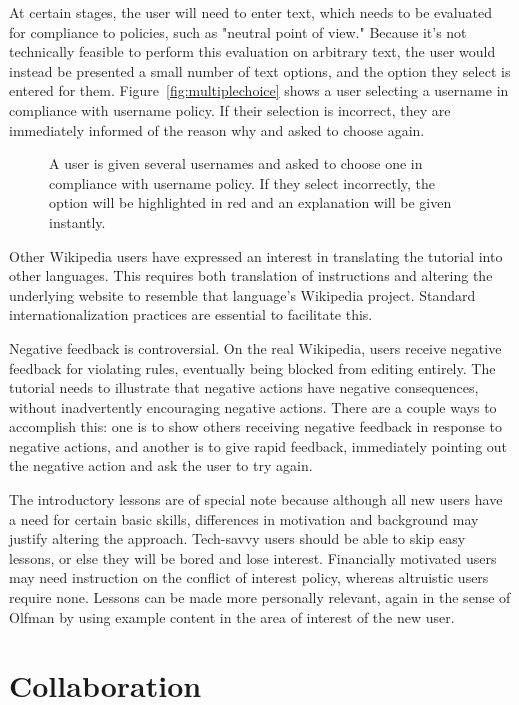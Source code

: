 \documentclass{acm_proc_article-sp}
\begin{document}
At certain stages, the user will need to enter text, which needs to be evaluated for compliance to policies, such as "neutral point of view." Because it's not technically feasible to perform this evaluation on arbitrary text, the user would instead be presented a small number of text options, and the option they select is entered for them. Figure~\ref{fig:multiplechoice} shows a user selecting a username in compliance with username policy. If their selection is incorrect, they are immediately informed of the reason why and asked to choose again.

\begin{figure}
\centering
{}
\caption{A user is given several usernames and asked to choose one in compliance with username policy. If they select incorrectly, the option will be highlighted in red and an explanation will be given instantly.}
\label{fig:talktemplate}
\end{figure}

Other Wikipedia users have expressed an interest in translating the tutorial into other languages. This requires both translation of instructions and altering the underlying website to resemble that language's Wikipedia project. Standard internationalization practices are essential to facilitate this.

Negative feedback is controversial. On the real Wikipedia, users receive negative feedback for violating rules, eventually being blocked from editing entirely. The tutorial needs to illustrate that negative actions have negative consequences, without inadvertently encouraging negative actions. There are a couple ways to accomplish this: one is to show others receiving negative feedback in response to negative actions, and another is to give rapid feedback, immediately pointing out the negative action and ask the user to try again.

The introductory lessons are of special note because although all new users have a need for certain basic skills, differences in motivation and background may justify altering the approach. Tech-savvy users should be able to skip easy lessons, or else they will be bored and lose interest.  Financially motivated users may need instruction on the conflict of interest policy, whereas altruistic users require none. Lessons can be made more personally relevant, again in the sense of Olfman\cite{Olfman:1991} by using example content in the area of interest of the new user.

\section{Collaboration}
\end{document}
